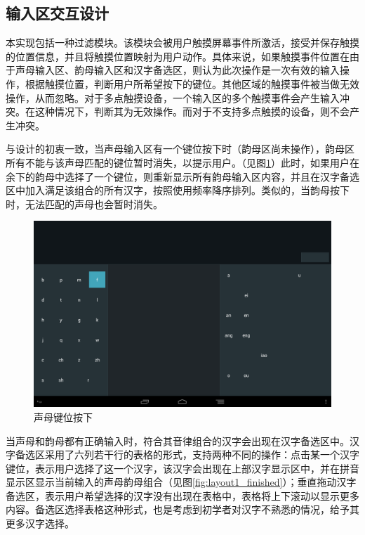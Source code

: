   \subsection{输入区交互设计}

  本实现包括一种过滤模块。该模块会被用户触摸屏幕事件所激活，接受并保存触摸的位置信息，并且将触摸位置映射为用户动作。具体来说，如果触摸事件位置在由于声母输入区、韵母输入区和汉字备选区，则认为此次操作是一次有效的输入操作，根据触摸位置，判断用户所希望按下的键位。其他区域的触摸事件被当做无效操作，从而忽略。对于多点触摸设备，一个输入区的多个触摸事件会产生输入冲突。在这种情况下，判断其为无效操作。而对于不支持多点触摸的设备，则不会产生冲突。

  与设计的初衷一致，当声母输入区有一个键位按下时（韵母区尚未操作），韵母区所有不能与该声母匹配的键位暂时消失，以提示用户。（见图\ref{fig:layout1_s_press_down}）此时，如果用户在余下的韵母中选择了一个键位，则重新显示所有韵母输入区内容，并且在汉字备选区中加入满足该组合的所有汉字，按照使用频率降序排列。类似的，当韵母按下时，无法匹配的声母也会暂时消失。

  \begin{figure}[h]
  \noindent\includegraphics[width=150mm]{img/layout1_s_press_down}
  \caption{声母键位按下}
  \label{fig:layout1_s_press_down}
  \end{figure}

  当声母和韵母都有正确输入时，符合其音律组合的汉字会出现在汉字备选区中。汉字备选区采用了六列若干行的表格的形式，支持两种不同的操作：点击某一个汉字键位，表示用户选择了这一个汉字，该汉字会出现在上部汉字显示区中，并在拼音显示区显示当前输入的声母韵母组合（见图\ref{fig:layout1_finished}）；垂直拖动汉字备选区，表示用户希望选择的汉字没有出现在表格中，表格将上下滚动以显示更多内容。备选区选择表格这种形式，也是考虑到初学者对汉字不熟悉的情况，给予其更多汉字选择。

